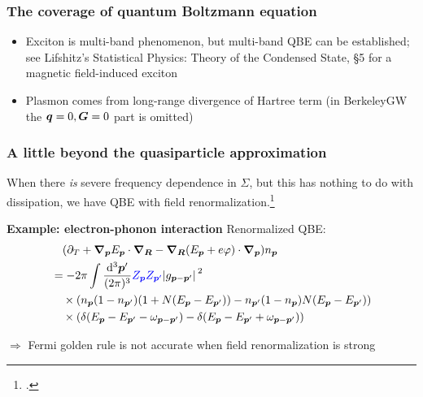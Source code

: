 \documentclass[t]{beamer}
\begin{document}
\begin{frame}
\frametitle{The coverage of quantum Boltzmann equation}

\begin{itemize}
    \item Exciton is multi-band phenomenon, but 
        multi-band QBE can be established; 
        see Lifshitz's Statistical Physics: Theory of the Condensed State, \S 5 
        for a magnetic field-induced exciton 
    \item Plasmon comes from long-range divergence of Hartree term
        (in BerkeleyGW the $\vb*{q} = 0, \vb*{G} = 0$ part is omitted)
\end{itemize}    

\end{frame}

\begin{frame}
\frametitle{A little beyond the quasiparticle approximation}

When there \emph{is} severe frequency dependence in $\Sigma$,
but this has nothing to do with dissipation,
we have QBE with field renormalization.\footcite{rammer1986quantum}

\vspace{0.25cm}

\textbf{Example: electron-phonon interaction } Renormalized QBE:
\begin{equation}
    \begin{aligned}
        &\quad (\partial_T + \grad_{\vb*{p}} E_{\vb*{p}} \cdot \grad_{\vb*{R}}
        - \grad_{\vb*{R}} (E_{\vb*{p}} + e \varphi) \cdot \grad_{\vb*{p}}) n_{\vb*{p}} \\
        &= - 2 \pi \int \frac{\dd[3]{\vb*{p}'}}{(2\pi)^3} 
        \textcolor{blue}{Z_{\vb*{p}} Z_{\vb*{p}'}}
        \abs*{g_{\vb*{p} - \vb*{p}'}}^2 \\
        &\quad \times (n_{\vb*{p}} (1 - n_{\vb*{p}'}) (1 + N(E_{\vb*{p}} - E_{\vb*{p}'}))
        - n_{\vb*{p}'} (1 - n_{\vb*{p}}) N(E_{\vb*{p}} - E_{\vb*{p}'})) \\
        &\quad \times (\delta(E_{\vb*{p}} - E_{\vb*{p}'} - \omega_{\vb*{p} - \vb*{p}'})
        - \delta(E_{\vb*{p}} - E_{\vb*{p}'} + \omega_{\vb*{p} - \vb*{p}'}))
    \end{aligned}
\end{equation}

$\Rightarrow$ Fermi golden rule is not accurate when field renormalization is strong

\end{frame}
\end{document}
